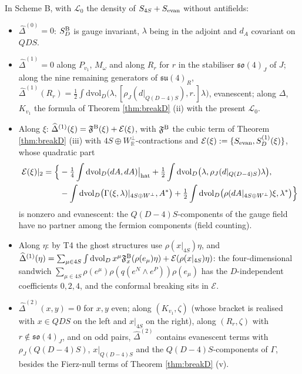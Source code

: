 \begin{theorem}
\label{thm:breakB}
In Scheme B, with $\mathscr L_0$ the density of $S_{4S}+S_{\rm evan}$ without antifields:
\begin{itemize}
\item[(i)] $\widehat\Delta^{(0)}=0$: $S^{\rm B}_D$ is gauge invariant, $\lambda$ being in the adjoint and $d_A$ covariant on $QDS$.
\item[(ii)] $\widehat\Delta^{(1)}=0$ along $P_{v_1}$, $M_\omega$ and along $R_r$ for $r$ in the stabiliser $\mathfrak{so}(4)_J$ of $J$; along the nine remaining generators of $\mathfrak{su}(4)_R$, $\widehat\Delta^{(1)}(R_r)=\frac12\int\mathrm{dvol}_D\big(\lambda,[\rho_J(d|_{Q(D-4)S}),r.]\lambda\big)$, evanescent; along $\Delta$, $K_{v_1}$ the formula of Theorem \ref{thm:breakD} (ii) with the present $\mathscr L_0$.
\item[(iii)] Along $\xi$: $\widehat\Delta^{(1)}(\xi)=\mathfrak F^{\rm B}(\xi)+\mathcal E(\xi)$, with $\mathfrak F^{\rm B}$ the cubic term of Theorem \ref{thm:breakD} (iii) with $4S\oplus W^\perp_{\mathbb R}$-contractions and $\mathcal E(\xi):=\{S_{\rm evan},S^{(1)}_D(\xi)\}$, whose quadratic part
\[
\begin{aligned}
\mathcal E(\xi)|_2=\Big\{&-\tfrac14\int\mathrm{dvol}_D(dA,dA)\big|_{\rm hat}+\tfrac12\int\mathrm{dvol}_D\big(\lambda,\rho_J(d|_{Q(D-4)S})\lambda\big),\\
&-\int\mathrm{dvol}_D\big(\Gamma(\xi,\lambda)|_{4S\oplus W^\perp},A^*\big)+\tfrac12\int\mathrm{dvol}_D\big(\rho(dA|_{4S\oplus W^\perp})\xi,\lambda^*\big)\Big\}
\end{aligned}
\]
is nonzero and evanescent: the $Q(D{-}4)S$-components of the gauge field have no partner among the fermion components (field counting).
\item[(iv)] Along $\eta$: by T4 the ghost structures use $\rho(x|_{4S})\eta$, and $\widehat\Delta^{(1)}(\eta)=\sum_{\mu\in4S}\int\mathrm{dvol}_D\,x^\mu\mathfrak F^{\rm B}_x(\rho(e_\mu)\eta)+\mathcal E(\rho(x|_{4S})\eta)$: the four-dimensional sandwich $\sum_{\mu\in4S}\rho(e^\mu)\rho(q(e^N\wedge e^P))\rho(e_\mu)$ has the $D$-independent coefficients $0,2,4$, and the conformal breaking sits in $\mathcal E$.
\item[(v)] $\widehat\Delta^{(2)}(x,y)=0$ for $x,y$ even; along $(K_{v_1},\zeta)$ (whose bracket is realised with $x\in QDS$ on the left and $x|_{4S}$ on the right), along $(R_r,\zeta)$ with $r\notin\mathfrak{so}(4)_J$, and on odd pairs, $\widehat\Delta^{(2)}$ contains evanescent terms with $\rho_J(Q(D{-}4)S)$, $x|_{Q(D-4)S}$ and the $Q(D{-}4)S$-components of $\Gamma$, besides the Fierz-null terms of Theorem \ref{thm:breakD} (v).
\end{itemize}
\end{theorem}


